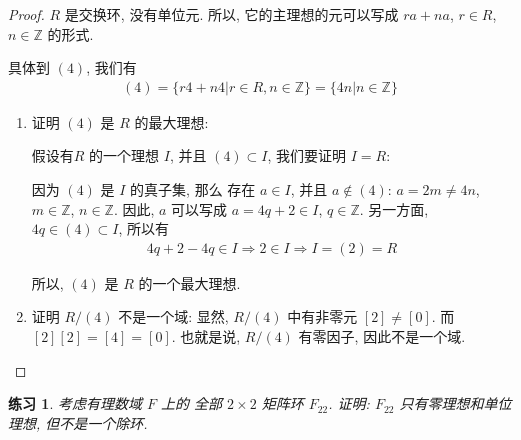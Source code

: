 \documentclass[utf8]{ctexbook}
\newtheorem{exercise}{练习}[section]
\begin{document}
\begin{proof}
$R$ 是交换环, 没有单位元. 所以, 它的主理想的元可以写成 $ra + na $, $r \in R$, $n \in \mathbb{Z}$ 的形式. 

具体到 $(4)$, 我们有
\begin{align*}
(4) = \{ r 4 + n 4 | r \in R, n \in \mathbb{Z} \} = \{ 4 n | n \in \mathbb{Z} \} 
\end{align*}
\begin{enumerate}
\item{证明 $(4)$ 是 $R$ 的最大理想:

假设有$R$ 的一个理想 $I$, 并且 $(4) \subset I$, 我们要证明 $I =R$:

因为 $(4)$ 是 $I$ 的真子集, 那么 存在 $a \in I$, 并且 $a \not \in (4)$: $a = 2m  \neq 4n $, $m \in \mathbb{Z}$, $n \in \mathbb{Z}$. 因此, $a$ 可以写成 $a = 4q + 2 \in I$, $q \in \mathbb{Z}$. 另一方面, $4q \in (4) \subset I $, 所以有
\begin{align*}
4q+2 - 4q \in I \Longrightarrow 2 \in I \Longrightarrow I = (2) = R
\end{align*}

所以, $(4)$ 是 $R$ 的一个最大理想.}
\item{证明 $R/(4)$ 不是一个域: 显然, $R/(4)$ 中有非零元 $[2] \neq [0]$. 而 $[2][2] = [4] = [0]$. 也就是说, $R/(4)$ 有零因子, 因此不是一个域.
}
\end{enumerate}
\end{proof}


\begin{exercise}
考虑有理数域 $F$ 上的 全部 $2 \times 2$ 矩阵环 $F_{22}$. 证明: $F_{22}$ 只有零理想和单位理想, 但不是一个除环.
\end{exercise}
\end{document}
